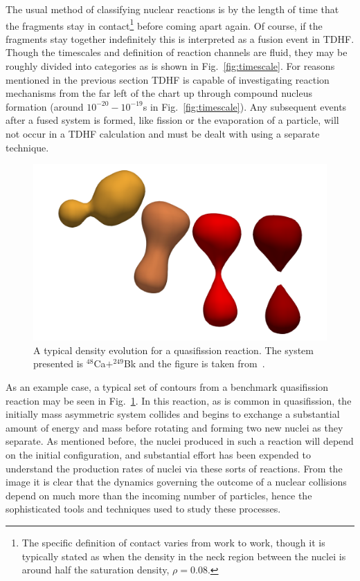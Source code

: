 The usual method of classifying nuclear reactions is by the length of time that the fragments stay in contact\footnote{The specific definition of contact varies from work to work, though it is typically stated as when the density in the neck region between the nuclei is around half the saturation density, $\rho=0.08$.} before coming apart again.
Of course, if the fragments stay together indefinitely this is interpreted as a fusion event in TDHF.
Though the timescales and definition of reaction channels are fluid, they may be roughly divided into categories as is shown in Fig.~\ref{fig:timescale}.
For reasons mentioned in the previous section TDHF is capable of investigating reaction mechanisms from the far left of the chart up through compound nucleus formation (around $10^{-20}-10^{-19}$s in Fig.~\ref{fig:timescale}).
Any subsequent events after a fused system is formed, like fission or the evaporation of a particle, will not occur in a TDHF calculation and must be dealt with using a separate technique.

\begin{figure}[t]
	\includegraphics[width=\textwidth]{../Figures/intro_figs/48Ca249BkEvolution_tr.png}
	\caption{A typical density evolution for a quasifission reaction. The system presented is $^{48}$Ca$+^{249}$Bk and the figure is taken from~\citep{godbey2020}.}
	\label{fig:qf}
\end{figure}

As an example case, a typical set of contours from a benchmark quasifission reaction may be seen in Fig.~\ref{fig:qf}.
In this reaction, as is common in quasifission, the initially mass asymmetric system collides and begins to exchange a substantial amount of energy and mass before rotating and forming two new nuclei as they separate.
As mentioned before, the nuclei produced in such a reaction will depend on the initial configuration, and substantial effort has been expended to understand the production rates of nuclei via these sorts of reactions.
From the image it is clear that the dynamics governing the outcome of a nuclear collisions depend on much more than the incoming number of particles, hence the sophisticated tools and techniques used to study these processes.


